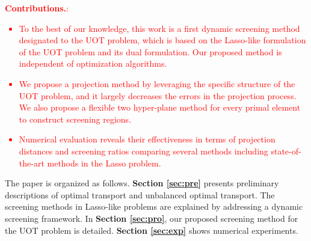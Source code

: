 \documentclass[twoside]{article}
\theoremstyle{plain}
\newcommand{\changeHK}[1]{\textcolor{red}{#1}}
\begin{document}
\changeHK{
\textbf{Contributions.}: 
\begin{itemize}
\item To the best of our knowledge, this work is a first dynamic screening method designated to the UOT problem, which is based on the Lasso-like formulation of the UOT problem and its dual formulation. Our proposed method is independent of optimization algorithms.
\item We propose a projection method by leveraging the specific structure of the UOT problem, and it largely decreases the errors in the projection process. 
We also propose a flexible two hyper-plane method  for every primal element to construct screening regions.
\item Numerical evaluation reveals their effectiveness in terms of projection distances and screening ratios comparing several methods including state-of-the-art methods in the Lasso problem.
\end{itemize}
}


The paper is organized as follows. {\bf Section \ref{sec:pre}} presents preliminary descriptions of optimal transport and unbalanced optimal transport. The screening methods in Lasso-like problems are explained by addressing a dynamic screening framework. In {\bf Section \ref{sec:pro}}, our proposed screening method for the UOT problem is detailed. {\bf Section \ref{sec:exp}} shows numerical experiments.
\end{document}
